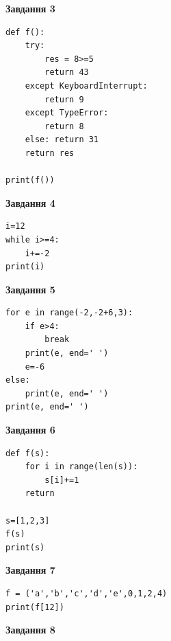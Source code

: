 \documentclass[12pt, ukrainian]{article}
\begin{document}
{{{{{{{{{{{{{{{\begin{minipage}[t]{7.5cm}
\begin{center}
\textbf{Завдання 3}
\end{center}

\begin{verbatim}
def f():
    try:
        res = 8>=5
        return 43
    except KeyboardInterrupt: 
        return 9
    except TypeError: 
        return 8
    else: return 31
    return res

print(f())
\end{verbatim}



\begin{center}
\textbf{Завдання 4}
\end{center}

\begin{verbatim}
i=12
while i>=4:
    i+=-2
print(i)
\end{verbatim}

\end{minipage}
\vline \hspace{6mm}
\begin{minipage}[t]{10.5cm}

\begin{center}
\textbf{Завдання 5}
\end{center}

\begin{verbatim}
for e in range(-2,-2+6,3):
    if e>4:
        break
    print(e, end=' ')
    e=-6
else:
    print(e, end=' ')
print(e, end=' ')
\end{verbatim}



\begin{center}
\textbf{Завдання 6}
\end{center}

\begin{verbatim}
def f(s):
    for i in range(len(s)):
        s[i]+=1
    return

s=[1,2,3]
f(s)
print(s)
\end{verbatim}



\begin{center}
\textbf{Завдання 7}
\end{center}

\begin{verbatim}
f = ('a','b','c','d','e',0,1,2,4)
print(f[12])
\end{verbatim}



\begin{center}
\textbf{Завдання 8}
\end{center}


\end{minipage}}}}}}}}}}}}}}}}
\end{document}
